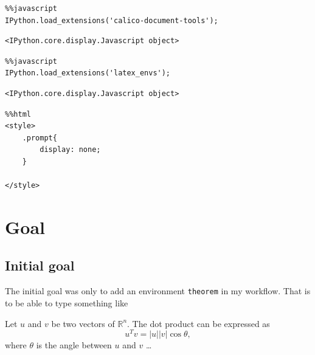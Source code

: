 
    
    
    
    


    

\begin{lstlisting}
%%javascript 
IPython.load_extensions('calico-document-tools');
\end{lstlisting}%
%
    
    \begin{verbatim}
<IPython.core.display.Javascript object>
    \end{verbatim}

\begin{lstlisting}
%%javascript 
IPython.load_extensions('latex_envs');
\end{lstlisting}%
%
    
    \begin{verbatim}
<IPython.core.display.Javascript object>
    \end{verbatim}

\begin{lstlisting}
%%html
<style>
    .prompt{
        display: none;
    }    

</style>
\end{lstlisting}
    \section{Goal}\label{goal}

    \subsection{Initial goal}\label{initial-goal}

    The initial goal was only to add an environment \texttt{theorem} in my
workflow. That is to be able to type something like

\begin{listing}
\begin{theorem}
Let $u$ and $v$ be two vectors of $\mathbb{R}^n$. The dot product can be
expressed as \begin{equation}u^Tv = |u||v| \cos \theta,\end{equation} where $\theta$ is the angle
between $u$ and $v$ \ldots{}
\end{theorem}
\end{listing}

